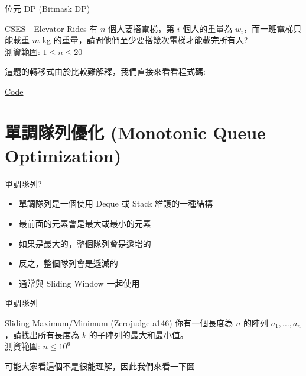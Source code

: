 \documentclass[aspectratio=169]{beamer}
\begin{document}
\begin{frame}[fragile]{位元 DP (Bitmask DP)}
    \begin{block}{CSES - Elevator Rides}
        有 $n$ 個人要搭電梯，第 $i$ 個人的重量為 $w_i$，而一班電梯只能載重 $m$ kg 的重量，請問他們至少要搭幾次電梯才能載完所有人? \\
        \vspace{5mm}
        測資範圍: $1 \le n \le 20$
    \end{block} 
    這題的轉移式由於比較難解釋，我們直接來看看程式碼: \\
    \begin{center}
        \href{https://github.com/HHSH-CYSH-WGSH-HSNU-Summer-Camp/DP-II/blob/main/Problem\%20Solution/CSES\%20-\%20Elevator\%20Rides.cpp}{Code}
    \end{center}
\end{frame}

\section{單調隊列優化 (Monotonic Queue Optimization)}

\begin{frame}[fragile]{單調隊列?}
    \begin{itemize}
        \item 單調隊列是一個使用 Deque 或 Stack 維護的一種結構
        \item 最前面的元素會是最大或最小的元素
        \item 如果是最大的，整個隊列會是遞增的
        \item 反之，整個隊列會是遞減的
        \item 通常與 Sliding Window 一起使用
    \end{itemize}
\end{frame}

\begin{frame}[fragile]{單調隊列}
    \begin{block}{Sliding Maximum/Minimum (Zerojudge a146)}
        你有一個長度為 $n$ 的陣列 $a_1, \dots, a_n$，請找出所有長度為 $k$ 的子陣列的最大和最小值。 \\
        \vspace{5mm}
        測資範圍: $n \le 10^6$
    \end{block}
    
    可能大家看這個不是很能理解，因此我們來看一下圖
\end{frame}
\end{document}
